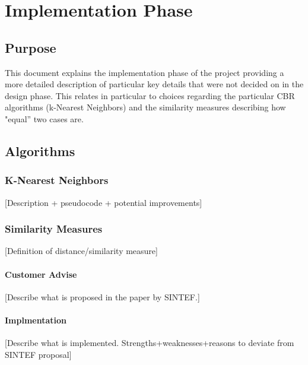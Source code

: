  

\chapter{Implementation Phase}
\label{impl}

\section{Purpose}
This document explains the implementation phase of the
project providing a more detailed description of particular key
details that were not decided on in the design phase. This relates in
particular to choices regarding the particular CBR algorithms
(k-Nearest Neighbors) and the similarity measures describing how
"equal'' two cases are.

\section{Algorithms}

\subsection{K-Nearest Neighbors}

[Description + pseudocode + potential improvements]

\subsection{Similarity Measures}

[Definition of distance/similarity measure]

\subsubsection{Customer Advise}
[Describe what is proposed in the paper by SINTEF.]

\subsubsection{Implmentation}
[Describe what is implemented. Strengths+weaknesses+reasons to deviate
from SINTEF proposal]

